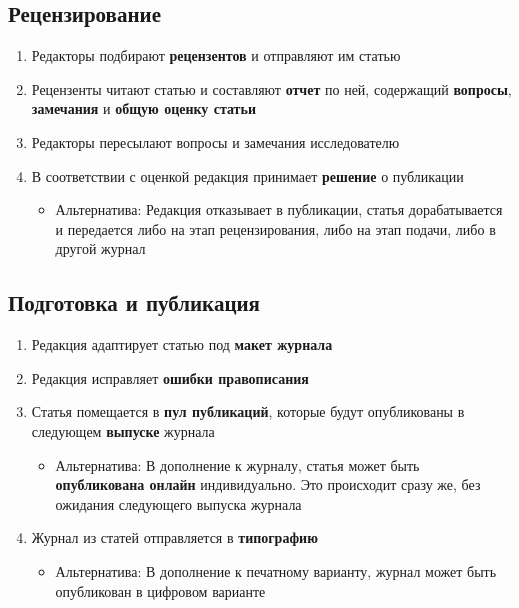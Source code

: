 \subsection{Рецензирование}

\begin{enumerate}
\item
  Редакторы подбирают \textbf{рецензентов} и отправляют им статью
\item
  Рецензенты читают статью и составляют \textbf{отчет} по ней,
  содержащий \textbf{вопросы}, \textbf{замечания} и \textbf{общую оценку
  статьи}
\item
  Редакторы пересылают вопросы и замечания исследователю
\item
  В соответствии с оценкой редакция принимает \textbf{решение} о
  публикации
  
  \begin{itemize}
  \item
    Альтернатива: Редакция отказывает в публикации, статья дорабатывается
    и передается либо на этап рецензирования, либо на этап подачи, либо в
    другой журнал
  \end{itemize}
\end{enumerate}

\subsection{Подготовка и публикация}

\begin{enumerate}
\item
  Редакция адаптирует статью под \textbf{макет журнала}
\item
  Редакция исправляет \textbf{ошибки правописания}
\item
  Статья помещается в \textbf{пул публикаций}, которые будут
  опубликованы в следующем \textbf{выпуске} журнала
  \begin{itemize}
  \item
    Альтернатива: В дополнение к журналу, статья может быть
    \textbf{опубликована онлайн} индивидуально. Это происходит сразу же,
    без ожидания следующего выпуска журнала
  \end{itemize}
\item
  Журнал из статей отправляется в \textbf{типографию}
  \begin{itemize}
  \item
    Альтернатива: В дополнение к печатному варианту, журнал может быть
    опубликован в цифровом варианте
  \end{itemize}
\end{enumerate}

